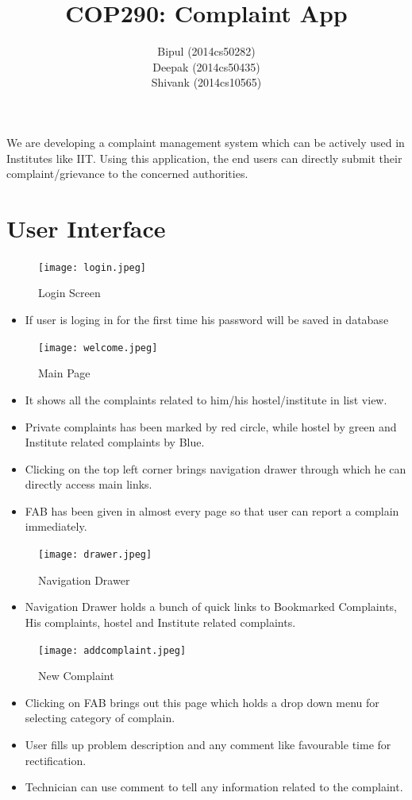 \documentclass[12pt]{article}
\title{COP290: Complaint App}
\author{Bipul (2014cs50282) \\ Deepak (2014cs50435) \\ Shivank (2014cs10565) }
\begin{document}
\maketitle

We are developing a complaint management system which can be actively used in Institutes like IIT. Using this application, the end users can directly submit their complaint/grievance to the concerned authorities.

\section{User Interface}

\begin{figure}[!ht]
	\centering
	\texttt{[image: login.jpeg]}
	\caption{Login Screen}
\end{figure}
\begin{itemize}
    \item If user is loging in for the first time his password will be saved in database
\end{itemize}

\begin{figure}[!ht]
	\centering
	\texttt{[image: welcome.jpeg]}
	\caption{Main Page}
\end{figure}
\begin{itemize}
    \item It shows all the complaints related to him/his hostel/institute in list view.
    \item Private complaints has been marked by red circle, while hostel by green and Institute related complaints by Blue.
    \item Clicking on the top left corner brings navigation drawer through which he can directly access main links. 
    \item FAB has been given in almost every page so that user can report a complain immediately.
\end{itemize}

\begin{figure}[!ht]
	\centering
	\texttt{[image: drawer.jpeg]}
	\caption{Navigation Drawer}
\end{figure}
\begin{itemize}
    \item Navigation Drawer holds a bunch of quick links to Bookmarked Complaints, His complaints, hostel and Institute related complaints.
\end{itemize}

\begin{figure}[!ht]
	\centering
	\texttt{[image: addcomplaint.jpeg]}
	\caption{New Complaint}
\end{figure}
\begin{itemize}
    \item Clicking on FAB brings out this page which holds a drop down menu for selecting category of complain.
    \item User fills up problem description and any comment like favourable time for rectification.
    \item Technician can use comment to tell any information related to the complaint.
\end{itemize}
\end{document}
